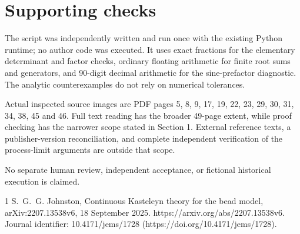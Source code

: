 \documentclass[10pt]{article}
\begin{document}
\section*{Supporting checks}
The script was independently written and run once with the existing Python runtime; no author code was executed. It uses exact fractions for the elementary determinant and factor checks, ordinary floating arithmetic for finite root sums and generators, and 90-digit decimal arithmetic for the sine-prefactor diagnostic. The analytic counterexamples do not rely on numerical tolerances.\par
Actual inspected source images are PDF pages 5, 8, 9, 17, 19, 22, 23, 29, 30, 31, 34, 38, 45 and 46. Full text reading has the broader 49-page extent, while proof checking has the narrower scope stated in Section 1. External reference texts, a publisher-version reconciliation, and complete independent verification of the process-limit arguments are outside that scope.\par
No separate human review, independent acceptance, or fictional historical execution is claimed.\par
1 S. G. G. Johnston, Continuous Kasteleyn theory for the bead model, arXiv:2207.13538v6, 18 September 2025. https://arxiv.org/abs/2207.13538v6. Journal identifier: 10.4171/jems/1728 (https://doi.org/10.4171/jems/1728).\par
\end{document}
